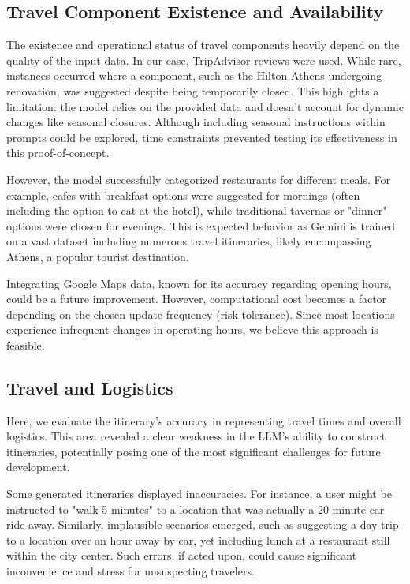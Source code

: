 \documentclass[12pt,a4paper]{report}
\begin{document}
\subsection{Travel Component Existence and Availability}

The existence and operational status of travel components heavily depend on the quality of the input data. In our case, TripAdvisor reviews were used. While rare, instances occurred where a component, such as the Hilton Athens undergoing renovation, was suggested despite being temporarily closed. This highlights a limitation: the model relies on the provided data and doesn't account for dynamic changes like seasonal closures. Although including seasonal instructions within prompts could be explored, time constraints prevented testing its effectiveness in this proof-of-concept.

However, the model successfully categorized restaurants for different meals. For example, cafes with breakfast options were suggested for mornings (often including the option to eat at the hotel), while traditional tavernas or "dinner" options were chosen for evenings. This is expected behavior as Gemini is trained on a vast dataset including numerous travel itineraries, likely encompassing Athens, a popular tourist destination.

Integrating Google Maps data, known for its accuracy regarding opening hours, could be a future improvement. However, computational cost becomes a factor depending on the chosen update frequency (risk tolerance). Since most locations experience infrequent changes in operating hours, we believe this approach is feasible.

\subsection{Travel and Logistics}

Here, we evaluate the itinerary's accuracy in representing travel times and overall logistics. This area revealed a clear weakness in the LLM's ability to construct itineraries, potentially posing one of the most significant challenges for future development.

Some generated itineraries displayed inaccuracies. For instance, a user might be instructed to "walk 5 minutes" to a location that was actually a 20-minute car ride away. Similarly, implausible scenarios emerged, such as suggesting a day trip to a location over an hour away by car, yet  including lunch at a restaurant still within the city center. Such errors, if acted upon, could cause significant inconvenience and stress for unsuspecting travelers.
\end{document}
